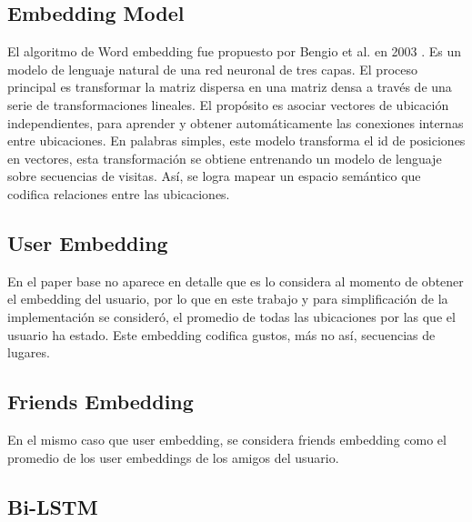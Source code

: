 \documentclass[sigplan,screen]{acmart}
\begin{document}
\subsection{Embedding Model}
El algoritmo de Word embedding fue propuesto por Bengio et al. en 2003 \cite{bengio2000neural}. Es un modelo de lenguaje natural de una red neuronal de tres capas. El proceso principal es transformar la matriz dispersa en una matriz densa a través de una serie de transformaciones lineales. El propósito es asociar vectores de ubicación independientes, para aprender y obtener automáticamente las conexiones internas entre ubicaciones. En palabras simples, este modelo transforma el id de posiciones en vectores, esta transformación se obtiene entrenando un modelo de lenguaje \cite{bengio2000neural} sobre secuencias de visitas. Así, se logra mapear un espacio semántico que codifica relaciones entre las ubicaciones. 

\subsection{User Embedding}
En el paper base no aparece en detalle que es lo considera al momento de obtener el embedding del usuario, por lo que en este trabajo y para simplificación de la implementación se consideró, el promedio de todas las ubicaciones por las que el usuario ha estado. Este embedding codifica gustos, más no así, secuencias de lugares. 

\subsection{Friends Embedding}
En el mismo caso que user embedding, se considera friends embedding como el promedio de los user embeddings de los amigos del usuario. 

\subsection{Bi-LSTM}
\end{document}
